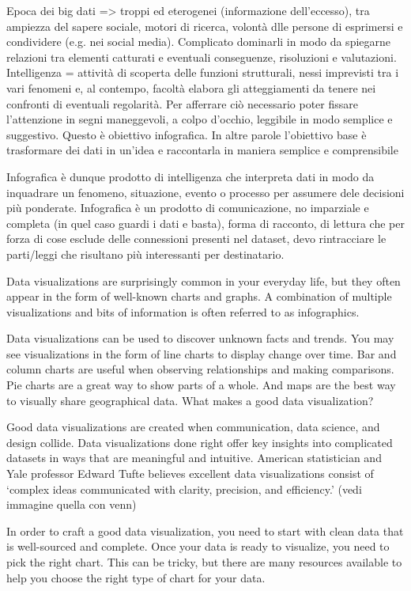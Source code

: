 Epoca dei big dati => troppi ed eterogenei (informazione dell’eccesso), tra ampiezza del sapere sociale, motori di ricerca, volontà dlle persone di esprimersi e condividere (e.g. nei social media). 
Complicato dominarli in modo da spiegarne relazioni tra elementi catturati e eventuali conseguenze, risoluzioni e valutazioni.  
Intelligenza = attività di scoperta delle funzioni strutturali, nessi imprevisti tra i vari fenomeni e, al contempo, facoltà elabora gli atteggiamenti da tenere nei confronti di eventuali regolarità. 
Per afferrare ciò necessario poter fissare l’attenzione in segni maneggevoli, a colpo d’occhio, leggibile in modo semplice e suggestivo. Questo è obiettivo infografica.  In altre parole l’obiettivo base è trasformare dei dati in un’idea e raccontarla in maniera semplice e comprensibile

Infografica è dunque prodotto di intelligenza che interpreta dati in modo da inquadrare un fenomeno, situazione, evento o processo per assumere dele decisioni più ponderate.
Infografica è un prodotto di comunicazione, no imparziale e completa (in quel caso guardi i dati e basta), forma di racconto, di lettura che per forza di cose esclude delle connessioni presenti nel dataset, devo rintracciare le parti/leggi che risultano più interessanti per destinatario.



Data visualizations are surprisingly common in your everyday life, but they often appear in the form of well-known charts and graphs. A combination of multiple visualizations and bits of information is often referred to as infographics.

Data visualizations can be used to discover unknown facts and trends. You may see visualizations in the form of line charts to display change over time. Bar and column charts are useful when observing relationships and making comparisons. Pie charts are a great way to show parts of a whole. And maps are the best way to visually share geographical data.
What makes a good data visualization?


Good data visualizations are created when communication, data science, and design collide. Data visualizations done right offer key insights into complicated datasets in ways that are meaningful and intuitive. American statistician and Yale professor Edward Tufte believes excellent data visualizations consist of ‘complex ideas communicated with clarity, precision, and efficiency.’
(vedi immagine quella con venn)

In order to craft a good data visualization, you need to start with clean data that is well-sourced and complete. Once your data is ready to visualize, you need to pick the right chart. This can be tricky, but there are many resources available to help you choose the right type of chart for your data. 

